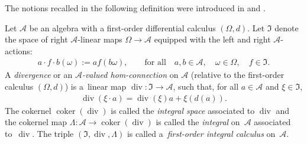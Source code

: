 \documentclass[10pt,a4paper]{amsart}
\numberwithin{equation}{section}
\begin{document}
The notions recalled in the following def\/inition were introduced in \cite{Brz:con} and \cite{BrzElK:int}.
\begin{Definition}\label{def.div}
Let ${\mathcal{A}}$ be an algebra with a f\/irst-order dif\/ferential calculus $(\Omega, d)$. Let ${\mathfrak I}$ denote the space of right ${\mathcal{A}}$-linear maps $\Omega \to {\mathcal{A}}$ equipped with the left and right ${\mathcal{A}}$-actions:
\begin{gather*}
a\cdot f\cdot b(\omega) := af(b\omega), \qquad \mbox{for all}\quad a,b\in {\mathcal{A}}, \quad \omega\in \Omega,\quad f\in {\mathfrak I}.
\end{gather*}
A {\em divergence} or an {\em ${\mathcal{A}}$-valued hom-connection} on ${\mathcal{A}}$ (relative to the f\/irst-order calculus $(\Omega, d)$) is a~linear map
$\operatorname{div} \colon {\mathfrak I} \to {\mathcal{A}}$, such that, for all $a\in {\mathcal{A}}$ and $\xi\in {\mathfrak I}$,
\begin{gather*}%
\operatorname{div}(\xi\cdot a) = \operatorname{div}(\xi) a + \xi(d(a)).
\end{gather*}
The cokernel $\operatorname{coker} (\operatorname{div})$ is called the {\em integral space} associated to $\operatorname{div}$ and the cokernel map $\Lambda\colon {\mathcal{A}} \to \operatorname{coker} (\operatorname{div})$ is called the {\em integral} on~${\mathcal{A}}$ associated to~$\operatorname{div}$. The triple $({\mathfrak I}, \operatorname{div},\Lambda)$ is called a~{\em first-order integral calculus} on~${\mathcal{A}}$.
\end{Definition}
\end{document}
